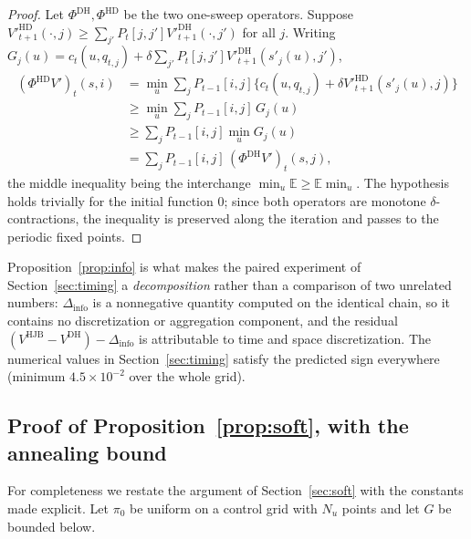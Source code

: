 \documentclass[pdflatex,sn-mathphys-num]{sn-jnl}
\theoremstyle{thmstyleone}
\theoremstyle{thmstyletwo}
\theoremstyle{thmstylethree}
\newcommand{\E}{\mathbb{E}}
\begin{document}
\begin{appendices}
\begin{proof}
Let $\Phi^{\mathrm{DH}},\Phi^{\mathrm{HD}}$ be the two one-sweep operators.
Suppose $V'^{\mathrm{HD}}_{t+1}(\cdot,j)\ge\sum_{j'}P_t[j,j']
V'^{\mathrm{DH}}_{t+1}(\cdot,j')$ for all $j$. Writing
$G_j(u)=c_t(u,q_{t,j})+\delta\sum_{j'}P_t[j,j']
V'^{\mathrm{DH}}_{t+1}(s'_j(u),j')$,
\begin{align*}
(\Phi^{\mathrm{HD}}V')_t(s,i)
&=\min_{u}\sum_j P_{t-1}[i,j]\Big\{c_t(u,q_{t,j})
+\delta V'^{\mathrm{HD}}_{t+1}(s'_j(u),j)\Big\}\\
&\ge\min_{u}\sum_j P_{t-1}[i,j]\,G_j(u)\\
&\ge\sum_j P_{t-1}[i,j]\min_{u}G_j(u)\\
&=\sum_j P_{t-1}[i,j]\,(\Phi^{\mathrm{DH}}V')_t(s,j),
\end{align*}
the middle inequality being the interchange
$\min_u\E\ge\E\min_u$. The hypothesis holds trivially for the initial
function $0$; since both operators are monotone $\delta$-contractions, the
inequality is preserved along the iteration and passes to the periodic
fixed points.
\end{proof}

Proposition~\ref{prop:info} is what makes the paired experiment of
Section~\ref{sec:timing} a \emph{decomposition} rather than a comparison of
two unrelated numbers: $\Delta_{\mathrm{info}}$ is a nonnegative quantity
computed on the identical chain, so it contains no discretization or
aggregation component, and the residual
$(V^{\mathrm{HJB}}-V^{\mathrm{DH}})-\Delta_{\mathrm{info}}$ is
attributable to time and space discretization. The numerical values in
Section~\ref{sec:timing} satisfy the predicted sign everywhere
(minimum $4.5\times10^{-2}$ over the whole grid).

\subsection{Proof of Proposition~\ref{prop:soft}, with the annealing bound}
\label{app:softproof}

For completeness we restate the argument of Section~\ref{sec:soft} with the
constants made explicit. Let $\pi_0$ be uniform on a control grid with
$N_u$ points and let $G$ be bounded below.


\end{appendices}
\end{document}
